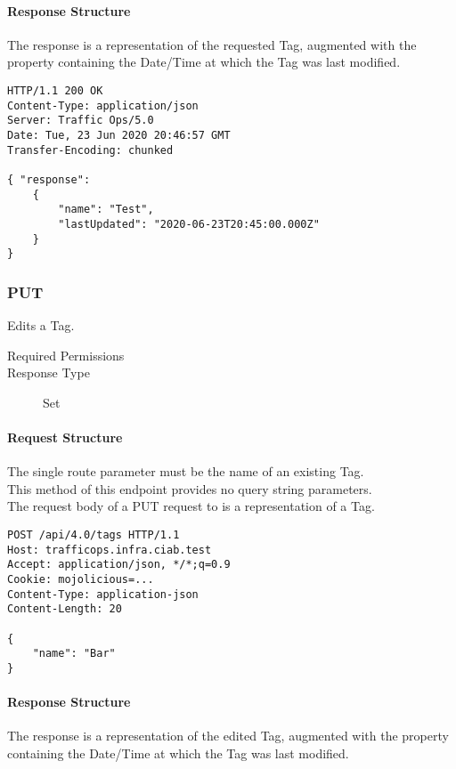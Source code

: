\paragraph{Response Structure}
The response is a representation of the requested Tag, augmented with the
 property containing the Date/Time at which the Tag was last
modified.

\begin{codelisting}
\begin{verbatim}
HTTP/1.1 200 OK
Content-Type: application/json
Server: Traffic Ops/5.0
Date: Tue, 23 Jun 2020 20:46:57 GMT
Transfer-Encoding: chunked

{ "response":
	{
		"name": "Test",
		"lastUpdated": "2020-06-23T20:45:00.000Z"
	}
}
\end{verbatim}
\end{codelisting}

\subsubsection{PUT}
Edits a Tag.
\begin{description}
	\item[Required Permissions] 
	\item[Response Type] Set
\end{description}

\paragraph{Request Structure}
The single route parameter  must be the name of an existing
Tag.\\
This method of this endpoint provides no query string parameters.\\
The request body of a PUT request to  is a
representation of a Tag.

\begin{codelisting}
\begin{verbatim}
POST /api/4.0/tags HTTP/1.1
Host: trafficops.infra.ciab.test
Accept: application/json, */*;q=0.9
Cookie: mojolicious=...
Content-Type: application-json
Content-Length: 20

{
	"name": "Bar"
}
\end{verbatim}
\end{codelisting}

\paragraph{Response Structure}
The response is a representation of the edited Tag, augmented with the
 property containing the Date/Time at which the Tag was last
modified.

